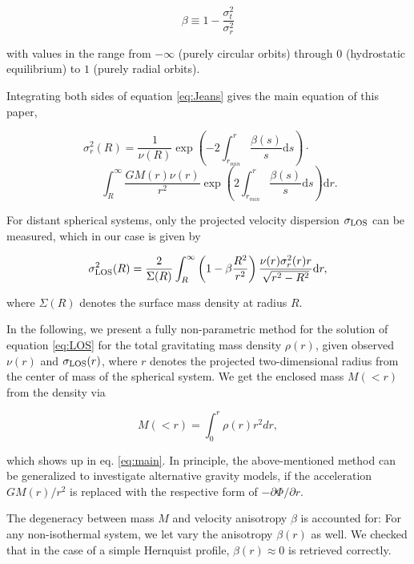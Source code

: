 \begin{equation}
\beta \equiv 1-\frac{\sigma_t^2}{\sigma_r^2}
\end{equation}

with values in the range from $-\infty$ (purely circular orbits)
through $0$ (hydrostatic equilibrium) to $1$ (purely radial orbits).

Integrating both sides of equation \ref{eq:Jeans} gives the main
equation of this paper,

\begin{equation}\label{eq:main}
\sigma_r^2(R) = \frac{1}{\nu(R)}\exp\left(-2\int_{r_{min}}^{r}\frac{\beta(s)}{s}\text{d}s\right)\cdot\qquad
\end{equation}
\begin{equation*}
\qquad\int_R^\infty \frac{GM(r)\nu(r)}{r^2} \exp\left(2\int_{r_{min}}^r\frac{\beta(s)}{s}\text{d}s\right)\text{d}r.
\end{equation*}

For distant spherical systems, only the projected velocity dispersion
$\sigma_{\text{LOS}}$ can be measured, which in our case is given by

\begin{equation}\label{eq:LOS}
\sigma_{\text{LOS}}^2(R) = \frac{2}{\Sigma(R)}\int_R^\infty \left(1-\beta\frac{R^2}{r^2}\right) \frac{\nu(r)\sigma_r^2(r) r}{\sqrt{r^2-R^2}}\text{d}r,
\end{equation}

where $\Sigma(R)$ denotes the surface mass density at radius $R$.

In the following, we present a fully non-parametric method for the
solution of equation \ref{eq:LOS} for the total gravitating mass
density $\rho(r)$, given observed $\nu(r)$ and $\sigma_{\text{LOS}}(r)$, where $r$
denotes the projected two-dimensional radius from the center of mass
of the spherical system. We get the enclosed mass $M(<r)$ from the
density via

\begin{equation}
M(<r) = \int_0^r \rho(r) r^2 dr,
\end{equation}

which shows up in eq. \ref{eq:main}. In principle, the above-mentioned
method can be generalized to investigate alternative gravity models,
if the acceleration $GM(r)/r^2$ is replaced with the respective form
of $-\partial\Phi/\partial r$.

The degeneracy between mass $M$ and velocity anisotropy $\beta$ is
accounted for: For any non-isothermal system, we let vary the
anisotropy $\beta(r)$ as well. We checked that in the case of a simple
Hernquist profile, $\beta(r)\approx0$ is retrieved correctly.

